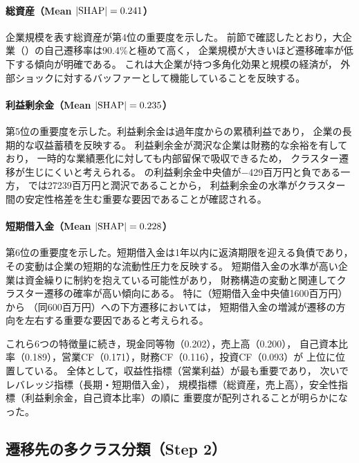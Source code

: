 \paragraph{総資産（Mean $|\mathrm{SHAP}| = 0.241$）}
企業規模を表す総資産が第4位の重要度を示した。
前節で確認したとおり，大企業（）の自己遷移率は90.4\%と極めて高く，
企業規模が大きいほど遷移確率が低下する傾向が明確である。
これは大企業が持つ多角化効果と規模の経済が，
外部ショックに対するバッファーとして機能していることを反映する。

\paragraph{利益剰余金（Mean $|\mathrm{SHAP}| = 0.235$）}
第5位の重要度を示した。利益剰余金は過年度からの累積利益であり，
企業の長期的な収益蓄積を反映する。
利益剰余金が潤沢な企業は財務的な余裕を有しており，
一時的な業績悪化に対しても内部留保で吸収できるため，
クラスター遷移が生じにくいと考えられる。
の利益剰余金中央値が$-$\num{429}百万円と負である一方，
では\num{27239}百万円と潤沢であることから，
利益剰余金の水準がクラスター間の安定性格差を生む重要な要因であることが確認される。

\paragraph{短期借入金（Mean $|\mathrm{SHAP}| = 0.228$）}
第6位の重要度を示した。短期借入金は1年以内に返済期限を迎える負債であり，
その変動は企業の短期的な流動性圧力を反映する。
短期借入金の水準が高い企業は資金繰りに制約を抱えている可能性があり，
財務構造の変動と関連してクラスター遷移の確率が高い傾向にある。
特に（短期借入金中央値\num{1600}百万円）から
（同\num{600}百万円）への下方遷移においては，
短期借入金の増減が遷移の方向を左右する重要な要因であると考えられる。

これら6つの特徴量に続き，現金同等物（0.202），売上高（0.200），
自己資本比率（0.189），営業CF（0.171），財務CF（0.116），投資CF（0.093）が
上位に位置している。
全体として，収益性指標（営業利益）が最も重要であり，
次いでレバレッジ指標（長期・短期借入金），
規模指標（総資産，売上高），安全性指標（利益剰余金，自己資本比率）の順に
重要度が配列されることが明らかになった。

\subsection{遷移先の多クラス分類（Step 2）}
\label{subsec:multiclass-classification}

